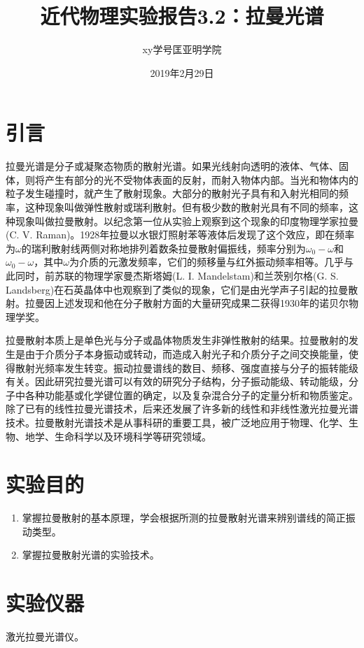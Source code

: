\documentclass[a4paper]{article}
\title{近代物理实验报告3.2：拉曼光谱}
\author{xy\quad 学号\quad 匡亚明学院}
\date{2019年2月29日}
\begin{document}
\maketitle


\section{引言}
拉曼光谱是分子或凝聚态物质的散射光谱。如果光线射向透明的液体、气体、固体，则将产生有部分的光不受物体表面的反射，而射入物体内部。当光和物体内的粒子发生碰撞时，就产生了散射现象。大部分的散射光子具有和入射光相同的频率，这种现象叫做弹性散射或瑞利散射。但有极少数的散射光具有不同的频率，这种现象叫做拉曼散射。以纪念第一位从实验上观察到这个现象的印度物理学家拉曼(C. V. Raman)。1928年拉曼以水银灯照射苯等液体后发现了这个效应，即在频率为$\omega$的瑞利散射线两侧对称地排列着数条拉曼散射偏振线，频率分别为$\omega_0-\omega$和$\omega_0-\omega$，其中$\omega$为介质的元激发频率，它们的频移量与红外振动频率相等。几乎与此同时，前苏联的物理学家曼杰斯塔姆(L. I. Mandelstam)和兰茨别尔格(G. S. Landsberg)在石英晶体中也观察到了类似的现象，它们是由光学声子引起的拉曼散射。拉曼因上述发现和他在分子散射方面的大量研究成果二获得1930年的诺贝尔物理学奖。

拉曼散射本质上是单色光与分子或晶体物质发生非弹性散射的结果。拉曼散射的发生是由于介质分子本身振动或转动，而造成入射光子和介质分子之间交换能量，使得散射光频率发生转变。振动拉曼谱线的数目、频移、强度直接与分子的振转能级有关。因此研究拉曼光谱可以有效的研究分子结构，分子振动能级、转动能级，分子中各种功能基或化学键位置的确定，以及复杂混合分子的定量分析和物质鉴定。除了已有的线性拉曼光谱技术，后来还发展了许多新的线性和非线性激光拉曼光谱技术。拉曼散射光谱技术是从事科研的重要工具，被广泛地应用于物理、化学、生物、地学、生命科学以及环境科学等研究领域。

\section{实验目的}
\begin{enumerate}
\item 掌握拉曼散射的基本原理，学会根据所测的拉曼散射光谱来辨别谱线的简正振动类型。
\item 掌握拉曼散射光谱的实验技术。
\end{enumerate}

\section{实验仪器}
激光拉曼光谱仪。
\end{document}
